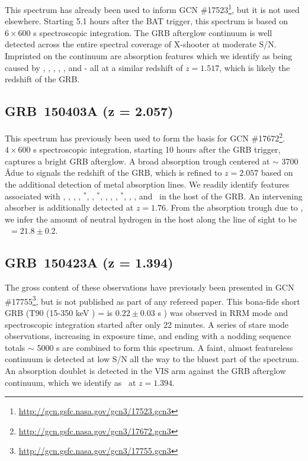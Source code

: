 \documentclass{aa}    %
\begin{document}
This spectrum has already been used to inform GCN
\#17523\footnote{\url{http://gcn.gsfc.nasa.gov/gcn3/17523.gcn3}}, but it is not
used elsewhere. Starting 5.1 hours after the BAT trigger, this spectrum is based
on $6 \times 600$ s spectroscopic integration. The GRB afterglow continuum is
well detected across the entire spectral coverage of X-shooter at moderate S/N.
Imprinted on the continuum are absorption features which we identify as being
caused by \SIii, \civ, \alii, \feii, \mgii, and \mgi - all at a similar redshift
of $z = 1.517$, which is likely the redshift of the GRB.

\subsection{GRB~150403A (z = 2.057)}	

This spectrum has previously been used to form the basis for GCN
\#17672\footnote{\url{http://gcn.gsfc.nasa.gov/gcn3/17672.gcn3}}. $4 \times
600$ s spectroscopic integration, starting 10 hours after the GRB trigger,
captures a bright GRB afterglow. A broad absorption trough centered at $\sim$
3700 \AA due to \lya signals the redshift of the GRB, which is refined to $z =
2.057$ based on the additional detection of metal absorption lines. We readily
identify features associated with \sii, \SIiv, \oi, \SIii, \SIii$^*$, \cii,
\cii$^*$, \civ, \alii, \feii, \feii$^*$, \mni, \mgii, and \mgi~in the host of
the GRB. An intervening \civ absorber is additionally detected at $z=1.76$. From
the absorption trough due to \lya, we infer the amount of neutral hydrogen in
the host along the line of sight to be \nh~$=21.8 \pm 0.2$.

\subsection{GRB~150423A (z = 1.394)}	

The gross content of these observations have previously been presented in GCN
\#17755\footnote{\url{http://gcn.gsfc.nasa.gov/gcn3/17755.gcn3}}, but is not
published as part of any refereed paper. This bona-fide short GRB (T90 (15-350
keV ) = is $ 0.22 \pm 0.03$ s \citep{Lien2016}) was observed in RRM mode and
spectroscopic integration started after only 22 minutes. A series of stare mode
observations, increasing in exposure time, and ending with a nodding sequence
totals $\sim$ 5000 s are combined to form this spectrum. A faint, almost
featureless continuum is detected at low S/N all the way to the bluest part of
the spectrum. An absorption doublet is detected in the VIS arm against the GRB
afterglow continuum, which we identify as \mgii~at $z = 1.394$.
\end{document}
